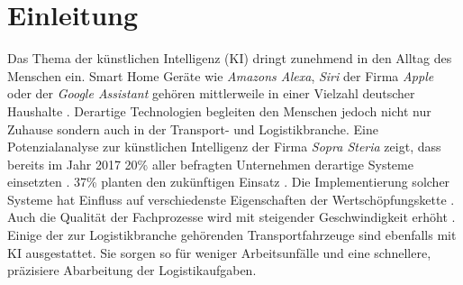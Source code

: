 
\chapter{Einleitung}
\label{ch: Einleitung}
	

		Das Thema der künstlichen Intelligenz (KI) dringt zunehmend in den Alltag des Menschen ein. Smart Home Geräte wie \textit{Amazons Alexa}, \textit{Siri} der Firma \textit{Apple} oder der \textit{Google Assistant} gehören mittlerweile in einer Vielzahl deutscher Haushalte \cite{bvdw}. Derartige Technologien begleiten den Menschen jedoch nicht nur Zuhause sondern auch in der Transport- und Logistikbranche. Eine Potenzialanalyse zur künstlichen Intelligenz der Firma \textit{Sopra Steria} zeigt, dass bereits im Jahr 2017 20\% aller befragten Unternehmen derartige Systeme einsetzten \cite{sopra}. 37\% planten den zukünftigen Einsatz \cite{sopra}. Die Implementierung solcher Systeme hat Einfluss auf verschiedenste Eigenschaften der Wertschöpfungskette \cite{sopra}. Auch die Qualität der Fachprozesse wird mit steigender Geschwindigkeit erhöht \cite{sopra}. Einige der zur Logistikbranche gehörenden Transportfahrzeuge sind ebenfalls mit KI ausgestattet. Sie sorgen so für weniger Arbeitsunfälle und eine schnellere, präzisiere Abarbeitung der Logistikaufgaben.\\
		
